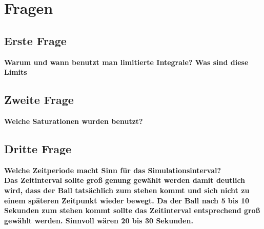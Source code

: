 \section{Fragen}
\subsection{Erste Frage}
\bfseries Warum und wann benutzt man limitierte Integrale? Was sind diese Limits \\

\subsection{Zweite Frage}
\bfseries Welche Saturationen wurden benutzt? \\

\subsection{Dritte Frage}
\bfseries Welche Zeitperiode macht Sinn für das Simulationsinterval? \\
Das Zeitinterval sollte groß genung gewählt werden damit deutlich wird, dass der Ball tatsächlich zum stehen kommt und sich nicht zu einem späteren Zeitpunkt wieder bewegt. Da der Ball nach 5 bis 10 Sekunden zum stehen kommt sollte das Zeitinterval entsprechend groß gewählt werden. Sinnvoll wären 20 bis 30 Sekunden.
